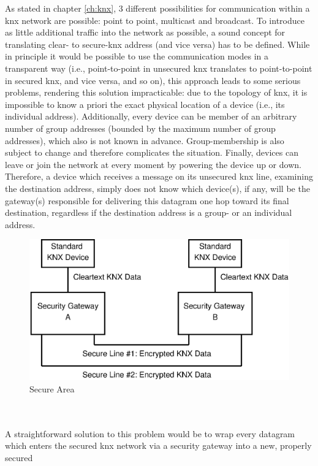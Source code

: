As stated in chapter \ref{ch:knx}, 3 different possibilities for communication within a \gls{knx} network are possible: point to point, multicast and broadcast.
To introduce as little additional traffic into the network as possible, a sound concept for translating clear- to secure-\gls{knx} address (and vice versa) has to
be defined. While in principle it would be possible to use the communication modes in a transparent way (i.e., point-to-point in unsecured \gls{knx} translates
to point-to-point in secured \gls{knx}, and vice versa, and so on), this approach leads to some serious problems, rendering this solution impracticable:
due to the topology of \gls{knx}, it is impossible to know a priori the exact physical location of a device (i.e., its individual address). Additionally,
every device can be member of an arbitrary number of group addresses (bounded by the maximum number of group addresses), which also is not known in advance.
Group-membership is also subject to change and therefore complicates the situation. Finally, devices can leave or join the network at every moment by powering the
device up or down.
\\
Therefore, a device which receives a message on its unsecured \gls{knx} line, examining the destination address, simply does
not know which device(s), if any, will be the gateway(s) responsible for delivering this datagram one hop toward its final destination, regardless if the destination address
is a group- or an individual address.
\begin{figure}
    \centering
    \includegraphics[width=1\textwidth]{figures/SecureArea.eps}
    \caption{Secure Area}
    \label{fig:secArea}
\end{figure}
\\
\\
A straightforward solution to this problem would be to wrap every datagram which enters the secured \gls{knx} network via a security gateway into a new, properly secured
